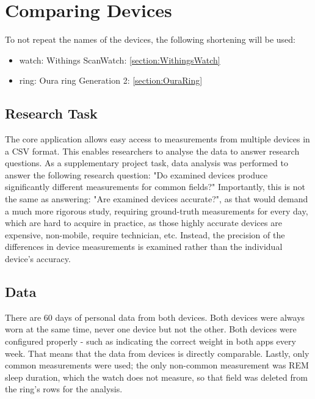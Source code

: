 \chapter{Comparing Devices}
To not repeat the names of the devices, the following shortening will be used: 
\begin{itemize}
    \item watch: Withings ScanWatch: \ref{section:WithingsWatch}
    \item ring: Oura ring Generation 2: \ref{section:OuraRing}
\end{itemize}
\section{Research Task}
The core application allows easy access to measurements from multiple devices in a CSV format. This enables researchers to analyse the data to answer research questions. As a supplementary project task, data analysis was performed to answer the following research question: "Do examined devices produce significantly different measurements for common fields?" Importantly, this is not the same as answering: "Are examined devices accurate?", as that would demand a much more rigorous study, requiring ground-truth measurements for every day, which are hard to acquire in practice, as those highly accurate devices are expensive, non-mobile, require technician, etc. Instead, the precision of the differences in device measurements is examined rather than the individual device's accuracy. 
\section{Data}
There are 60 days of personal data from both devices. Both devices were always worn at the same time, never one device but not the other. Both devices were configured properly - such as indicating the correct weight in both apps every week. That means that the data from devices is directly comparable. Lastly, only common measurements were used; the only non-common measurement was REM sleep duration, which the watch does not measure, so that field was deleted from the ring's rows for the analysis.
